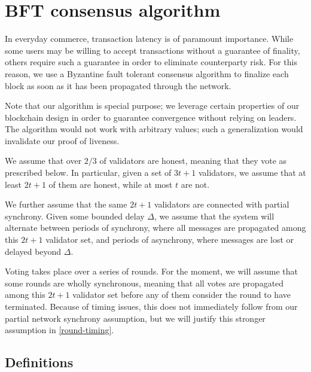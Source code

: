 \section{BFT consensus algorithm}
\label{consensus}

\newcommand{\vote}[1]{\angled{#1}}
\newcommand{\preparevote}[1]{\vote{\mathtt{PREPARE}, #1}}
\newcommand{\commitvote}[1]{\vote{\mathtt{COMMIT}, #1}}
\newcommand{\prepared}[2][]{\operatorname{prepared}_{#1}(#2)}
\newcommand{\committed}[2][]{\operatorname{committed}_{#1}(#2)}

In everyday commerce, transaction latency is of paramount importance. While some users may be willing to accept transactions without a guarantee of finality, others require such a guarantee in order to eliminate counterparty risk. For this reason, we use a Byzantine fault tolerant consensus algorithm to finalize each block as soon as it has been propagated through the network.

Note that our algorithm is special purpose; we leverage certain properties of our blockchain design in order to guarantee convergence without relying on leaders. The algorithm would not work with arbitrary values; such a generalization would invalidate our proof of liveness.

We assume that over $2/3$ of validators are honest, meaning that they vote as prescribed below. In particular, given a set of $3t + 1$ validators, we assume that at least $2t + 1$ of them are honest, while at most $t$ are not.

We further assume that the same $2t + 1$ validators are connected with partial synchrony. Given some bounded delay $\Delta$, we assume that the system will alternate between periods of synchrony, where all messages are propagated among this $2t + 1$ validator set, and periods of asynchrony, where messages are lost or delayed beyond $\Delta$.

Voting takes place over a series of rounds. For the moment, we will assume that some rounds are wholly synchronous, meaning that all votes are propagated among this $2t + 1$ validator set before any of them consider the round to have terminated. Because of timing issues, this does not immediately follow from our partial network synchrony assumption, but we will justify this stronger assumption in \autoref{round-timing}.


\subsection{Definitions}

